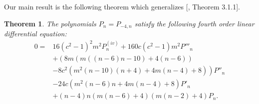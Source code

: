 \documentclass[review,nopreprintline]{elsarticle}
\newtheorem{theorem}{Theorem}[section]
\theoremstyle{definition}
\numberwithin{equation}{section}
\theoremstyle{remark}
\begin{document}
	     Our main result is the following theorem which generalizes  [\cite{Cox2013DJKMPolynomials}, Theorem 3.1.1].
	        
	      \begin{theorem}\label{thm:P_4ODE_System}
	            The polynomials $P_n=P_{-4,n}$ satisfy the following fourth order linear differential equation:
	            \begin{align}\label{eqdiferencial1}
	                0=&16 \left(c^2-1\right)^2 m^2 P^ {(iv)}_n +160 c \left(c^2-1\right) m^2 P'''_n \nonumber\\
	            &+\left(8 m (m ((n-6) n-10)+4 (n-6))\right.\nonumber\\
	            &\left.-8 c^2 \left(m^2 (n-10) (n+4)+4 m (n-4)+8\right)\right) P''_n \nonumber\\
	            &-24 c \left(m^2 (n-6) n+4 m (n-4)+8\right)  P'_n \nonumber\\
	            &+(n-4) n (m (n-6)+4) (m (n-2)+4) P_n. 
	            \end{align}
	        \end{theorem}    
	        
\end{document}
